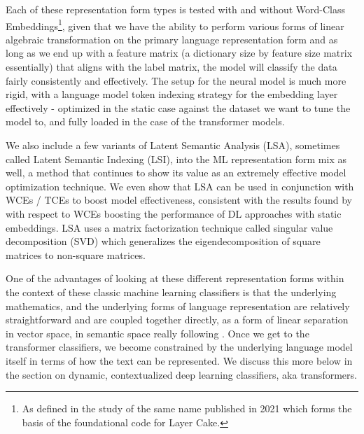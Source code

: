 \documentclass[final]{clv2025}
\begin{document}
Each of these representation form types is tested with and without Word-Class Embeddings\footnote{As defined in the study of the same name published in 2021 \cite{moreo2021} which forms the basis of the foundational code for Layer Cake.}, given that we have the ability to perform various forms of linear algebraic transformation on the primary language representation form and as long as we end up with a feature matrix  (a  dictionary size by feature size matrix essentially) that aligns with the label matrix, the model will classify the data fairly consistently and effectively. The setup for the neural model is much more rigid, with a language model token indexing strategy for the embedding layer effectively - optimized in the static case against the dataset we want to tune the model to, and fully loaded in the case of the transformer models.   

We also include a few variants of Latent Semantic Analysis (LSA), sometimes called Latent Semantic Indexing (LSI), \cite{deerwester} into the ML representation form mix as well, a method that continues to show its value as an extremely effective model optimization technique. We even show that LSA can be used in conjunction with WCEs / TCEs to boost model effectiveness, consistent with the results found by \cite{moreo2021} with respect to WCEs boosting the performance of DL approaches with static embeddings. LSA uses a matrix factorization technique called singular value decomposition (SVD) which generalizes the eigendecomposition of square matrices to non-square matrices. 

One of the advantages of looking at these different representation forms within the context of these classic machine learning classifiers is that the underlying mathematics, and the underlying forms of language representation are relatively straightforward and are coupled together directly, as a form of linear separation in vector space, in semantic space really following \cite{worth}. Once we get to the transformer classifiers, we become constrained by the underlying language model itself in terms of how the text can be represented. We discuss this more below in the section on dynamic, contextualized deep learning classifiers, aka transformers.
\end{document}

